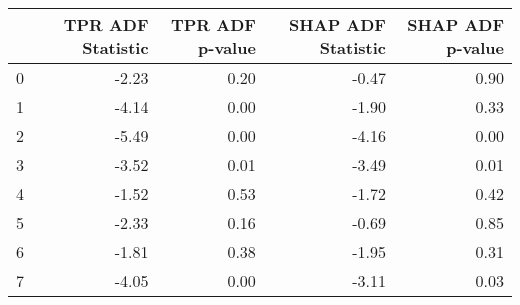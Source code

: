 \begin{tabular}{lrrrr}
\toprule
 & TPR ADF Statistic & TPR ADF p-value & SHAP ADF Statistic & SHAP ADF p-value \\
\midrule
0 & -2.23 & 0.20 & -0.47 & 0.90 \\
1 & -4.14 & 0.00 & -1.90 & 0.33 \\
2 & -5.49 & 0.00 & -4.16 & 0.00 \\
3 & -3.52 & 0.01 & -3.49 & 0.01 \\
4 & -1.52 & 0.53 & -1.72 & 0.42 \\
5 & -2.33 & 0.16 & -0.69 & 0.85 \\
6 & -1.81 & 0.38 & -1.95 & 0.31 \\
7 & -4.05 & 0.00 & -3.11 & 0.03 \\
\bottomrule
\end{tabular}
